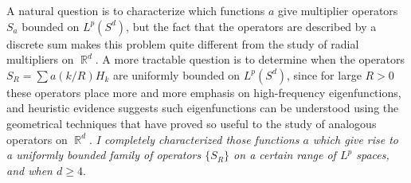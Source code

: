 \documentclass[11pt]{article}
\DeclareMathOperator{\RR}{\mathbb{R}}
\begin{document}
A natural question is to characterize which functions $a$ give multiplier operators $S_a$ bounded on $L^p(S^d)$, but the fact that the operators are described by a discrete sum makes this problem quite different from the study of radial multipliers on $\RR^d$. A more tractable question is to determine when the operators $S_R = \sum a(k/R) H_k$ are uniformly bounded on $L^p(S^d)$, since for large $R > 0$ these operators place more and more emphasis on high-frequency eigenfunctions, and heuristic evidence suggests such eigenfunctions can be understood using the geometrical techniques that have proved so useful to the study of analogous operators on $\RR^d$. \emph{I completely characterized those functions $a$ which give rise to a uniformly bounded family of operators $\{ S_R \}$ on a certain range of $L^p$ spaces, and when $d \geq 4$}.



\end{document}

